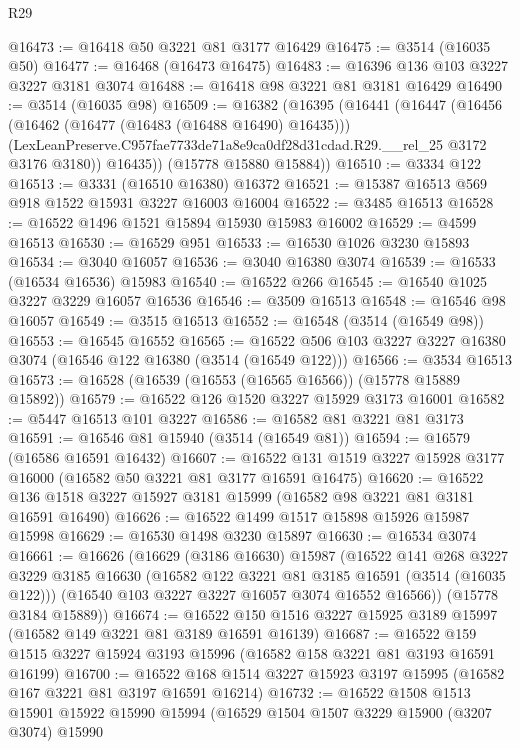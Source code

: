 \begin{lexlean}{R29}
\begin{coremodule}
@16473 := @16418 @50 @3221 @81 @3177 @16429
@16475 := @3514 (@16035 @50)
@16477 := @16468 (@16473 @16475)
@16483 := @16396 @136 @103 @3227 @3227 @3181 @3074
@16488 := @16418 @98 @3221 @81 @3181 @16429
@16490 := @3514 (@16035 @98)
@16509 := @16382
    (@16395
      (@16441
        (@16447
          (@16456
            (@16462 (@16477 (@16483 (@16488 @16490) @16435)))
            (LexLeanPreserve.C957fae7733de71a8e9ca0df28d31cdad.R29.__rel_25 @3172 @3176 @3180))
          @16435))
      (@15778 @15880 @15884))
@16510 := @3334 @122
@16513 := @3331 (@16510 @16380) @16372
@16521 := @15387 @16513 @569 @918 @1522 @15931 @3227 @16003 @16004
@16522 := @3485 @16513
@16528 := @16522 @1496 @1521 @15894 @15930 @15983 @16002
@16529 := @4599 @16513
@16530 := @16529 @951
@16533 := @16530 @1026 @3230 @15893
@16534 := @3040 @16057
@16536 := @3040 @16380 @3074
@16539 := @16533 (@16534 @16536) @15983
@16540 := @16522 @266
@16545 := @16540 @1025 @3227 @3229 @16057 @16536
@16546 := @3509 @16513
@16548 := @16546 @98 @16057
@16549 := @3515 @16513
@16552 := @16548 (@3514 (@16549 @98))
@16553 := @16545 @16552
@16565 := @16522 @506 @103 @3227 @3227 @16380 @3074 (@16546 @122 @16380 (@3514 (@16549 @122)))
@16566 := @3534 @16513
@16573 := @16528 (@16539 (@16553 (@16565 @16566)) (@15778 @15889 @15892))
@16579 := @16522 @126 @1520 @3227 @15929 @3173 @16001
@16582 := @5447 @16513 @101 @3227
@16586 := @16582 @81 @3221 @81 @3173
@16591 := @16546 @81 @15940 (@3514 (@16549 @81))
@16594 := @16579 (@16586 @16591 @16432)
@16607 := @16522 @131 @1519 @3227 @15928 @3177 @16000 (@16582 @50 @3221 @81 @3177 @16591 @16475)
@16620 := @16522 @136 @1518 @3227 @15927 @3181 @15999 (@16582 @98 @3221 @81 @3181 @16591 @16490)
@16626 := @16522 @1499 @1517 @15898 @15926 @15987 @15998
@16629 := @16530 @1498 @3230 @15897
@16630 := @16534 @3074
@16661 := @16626
    (@16629
      (@3186 @16630)
      @15987
      (@16522
        @141
        @268
        @3227
        @3229
        @3185
        @16630
        (@16582 @122 @3221 @81 @3185 @16591 (@3514 (@16035 @122)))
        (@16540 @103 @3227 @3227 @16057 @3074 @16552 @16566))
      (@15778 @3184 @15889))
@16674 := @16522 @150 @1516 @3227 @15925 @3189 @15997 (@16582 @149 @3221 @81 @3189 @16591 @16139)
@16687 := @16522 @159 @1515 @3227 @15924 @3193 @15996 (@16582 @158 @3221 @81 @3193 @16591 @16199)
@16700 := @16522 @168 @1514 @3227 @15923 @3197 @15995 (@16582 @167 @3221 @81 @3197 @16591 @16214)
@16732 := @16522
    @1508
    @1513
    @15901
    @15922
    @15990
    @15994
    (@16529
      @1504
      @1507
      @3229
      @15900
      (@3207 @3074)
      @15990

\end{coremodule}
\end{lexlean}

